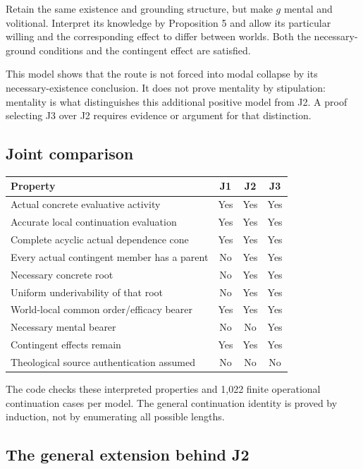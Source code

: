 \documentclass[11pt,a4paper]{article}
\begin{document}
Retain the same existence and grounding structure, but make \(g\) mental
and volitional. Interpret its knowledge by Proposition 5 and allow its
particular willing and the corresponding effect to differ between
worlds. Both the necessary-ground conditions and the contingent effect
are satisfied.

This model shows that the route is not forced into modal collapse by its
necessary-existence conclusion. It does not prove mentality by
stipulation: mentality is what distinguishes this additional positive
model from J2. A proof selecting J3 over J2 requires evidence or
argument for that distinction.

\subsection{Joint comparison}\label{joint-comparison}

\begin{longtable}[]{@{}lccc@{}}
\toprule\noalign{}
Property & J1 & J2 & J3 \\
\midrule\noalign{}
\endhead
\bottomrule\noalign{}
\endlastfoot
Actual concrete evaluative activity & Yes & Yes & Yes \\
Accurate local continuation evaluation & Yes & Yes & Yes \\
Complete acyclic actual dependence cone & Yes & Yes & Yes \\
Every actual contingent member has a parent & No & Yes & Yes \\
Necessary concrete root & No & Yes & Yes \\
Uniform underivability of that root & No & Yes & Yes \\
World-local common order/efficacy bearer & Yes & Yes & Yes \\
Necessary mental bearer & No & No & Yes \\
Contingent effects remain & Yes & Yes & Yes \\
Theological source authentication assumed & No & No & No \\
\end{longtable}

The code checks these interpreted properties and 1,022 finite
operational continuation cases per model. The general continuation
identity is proved by induction, not by enumerating all possible
lengths.

\subsection{The general extension behind
J2}\label{the-general-extension-behind-j2}
\end{document}
